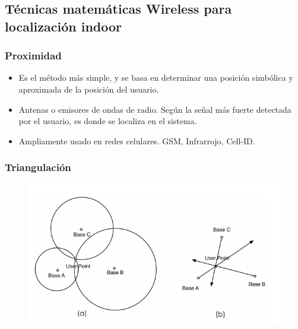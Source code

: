 \documentclass[handout]{beamer}
\begin{document}
\subsection{Técnicas  matemáticas Wireless para localización indoor}
\begin{frame}
\frametitle{Proximidad}

\begin{itemize}

\item Es el método más simple, y se basa en determinar una posición simbólica y aproximada de la posición del usuario.

\item Antenas o emisores de ondas de radio. Según la señal más fuerte detectada por el usuario, es donde se localiza en el sistema.

\item Ampliamente usado en redes celulares. GSM, Infrarrojo, Cell-ID.
\end{itemize}


\end{frame}


\begin{frame}
\frametitle{Triangulación}

\begin{figure}
\includegraphics[width=\linewidth]{../figures/triangulacion.png}
\end{figure}

\end{frame}

\end{document}
